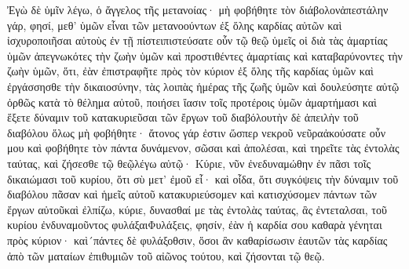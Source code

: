 Ἐγὼ δὲ ὑμῖν λέγω, ὁ ἄγγελος τῆς μετανοίας· μὴ φοβήθητε τὸν διάβολονἀπεστάλην γάρ, φησί, μεθ’ ὑμῶν εἶναι τῶν μετανοούντων ἐξ ὅλης καρδίας αὐτῶν καὶ ἰσχυροποιῆσαι αὐτοὺς ἐν τῇ πίστειπιστεύσατε οὖν τῷ θεῷ ὑμεῖς οἱ διὰ τὰς ἁμαρτίας ὑμῶν ἀπεγνωκότες τὴν ζωὴν ὑμῶν καὶ προστιθέντες ἁμαρτίαις καὶ καταβαρύνοντες τὴν ζωὴν ὑμῶν, ὅτι, ἐὰν ἐπιστραφῆτε πρὸς τὸν κύριον ἐξ ὅλης τῆς καρδίας ὑμῶν καὶ ἐργάσσησθε τὴν δικαιοσύνην, τὰς λοιπὰς ἡμέρας τῆς ζωῆς ὑμῶν καὶ δουλεύσητε αὐτῷ ὀρθῶς κατὰ τὸ θέλημα αὐτοῦ, ποιήσει ἴασιν τοῖς προτέροις ὑμῶν ἁμαρτήμασι καὶ ἕξετε δύναμιν τοῦ κατακυριεῦσαι τῶν ἔργων τοῦ διαβόλουτὴν δὲ ἀπειλὴν τοῦ διαβόλου ὅλως μὴ φοβήθητε· ἄτονος γάρ ἐστιν ὥσπερ νεκροῦ νεῦραἀκούσατε οὖν μου καὶ φοβήθητε τὸν πάντα δυνάμενον, σῶσαι καὶ ἀπολέσαι, καὶ τηρεῖτε τὰς ἐντολὰς ταύτας, καὶ ζήσεσθε τῷ θεῷλέγω αὐτῷ· Κύριε, νῦν ἐνεδυναμώθην ἐν πᾶσι τοῖς δικαιώμασι τοῦ κυρίου, ὅτι σὺ μετ’ ἐμοῦ εἶ· καὶ οἶδα, ὅτι συγκόψεις τὴν δύναμιν τοῦ διαβόλου πᾶσαν καὶ ἡμεῖς αὐτοῦ κατακυριεύσομεν καὶ κατισχύσομεν πάντων τῶν ἔργων αὐτοῦκαὶ ἐλπίζω, κύριε, δυνασθαί με τὰς ἐντολὰς ταύτας, ἃς ἐντεταλσαι, τοῦ κυρίου ἐνδυναμοῦντος φυλάξαιΦυλάξεις, φησίν, ἐὰν ἡ καρδία σου καθαρὰ γένηται πρὸς κύριον· καὶ´πάντες δὲ φυλάξοθσιν, ὅσοι ἂν καθαρίσωσιν ἑαυτῶν τὰς καρδίας ἀπὸ τῶν ματαίων ἐπιθυμιῶν τοῦ αἰῶνος τούτου, καὶ ζήσονται τῷ θεῷ.

